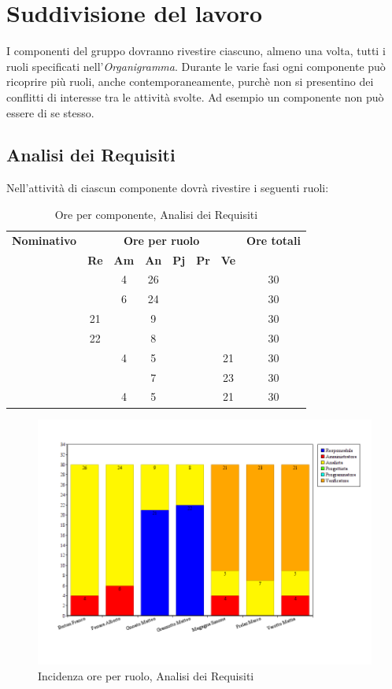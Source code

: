 \section{Suddivisione del lavoro}
I componenti del gruppo dovranno rivestire ciascuno, almeno una volta, tutti i ruoli specificati nell'\textit{Organigramma}.
Durante le varie fasi ogni componente può ricoprire più ruoli, anche contemporaneamente, purchè non si presentino dei conflitti di interesse tra le attività svolte. Ad esempio un componente non può essere \textit{\Ver} di se stesso.
\subsection{Analisi dei Requisiti}
Nell'attività di \textit{\AdR} ciascun componente dovrà rivestire i seguenti ruoli:
\begin{table}[H]
	\begin{center}
		\begin{tabular}{|c|c|c|c|c|c|c|c|}
			\hline
			\textbf{Nominativo} & \multicolumn{6}{c|}{\textbf{Ore per ruolo}} & \textbf{Ore totali} \\
			& \textbf{Re} & \textbf{Am} & \textbf{An} & \textbf{Pj} & \textbf{Pr} & \textbf{Ve} & \\
			\hline
			\FB	&		&	4	&	26	&		&		&		&	30	\\
			\hline
			\AF		&		&	6	&	24	&	 	&		&		& 	30	\\
			\hline
			\GN		&	21	&		&	9	&		&		&		&	30	\\
			\hline						
			\GR	&	22	&	 	&	8 	&		&	 	& 		&	30	\\
			\hline
			\SM 		&		&	4	&	5	&		&		& 	21	&	30	\\
			\hline
			\MP		& 		&		&	7	&		&		&	23	&	30	\\
			\hline						
			\MV 		&		&	4	&	5	&		&		&	21	& 	30	\\
			\hline
		\end{tabular}
	\end{center}
	\caption{Ore per componente, Analisi dei Requisiti}
\end{table}

\begin{figure}[H]
	\centering
	\includegraphics[scale=0.4]{immagini/Grafi/GrafoAR}
	\caption{Incidenza ore per ruolo, Analisi dei Requisiti}
\end{figure}

